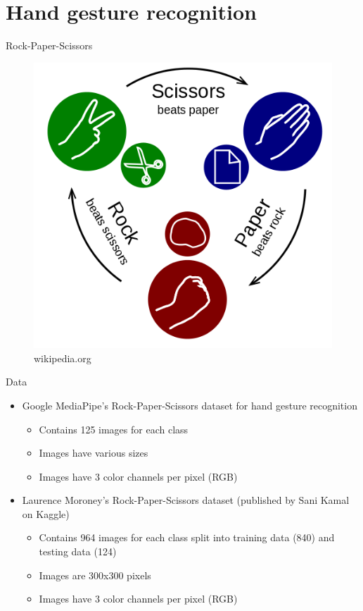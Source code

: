 
\section{Hand gesture recognition}

\begin{frame}{Rock-Paper-Scissors}
  \begin{figure}
	\includegraphics[width=\linewidth,height=0.75\textheight,keepaspectratio]{images/502px-Rock-paper-scissors.svg.png}
	\caption{wikipedia.org}
  \end{figure}
\end{frame}

\begin{frame}{Data}
  \begin{itemize}
	\item Google MediaPipe's Rock-Paper-Scissors dataset for hand gesture
	recognition
	  \begin{itemize}
		\item Contains 125 images for each class
		\item Images have various sizes
		\item Images have 3 color channels per pixel (RGB)
	  \end{itemize}
	\item Laurence Moroney's Rock-Paper-Scissors dataset (published by Sani
	Kamal on Kaggle)
	  \begin{itemize}
		\item Contains 964 images for each class split into training data
		(840) and testing data (124)
		\item Images are 300x300 pixels
		\item Images have 3 color channels per pixel (RGB)
	  \end{itemize}
  \end{itemize}
\end{frame}

